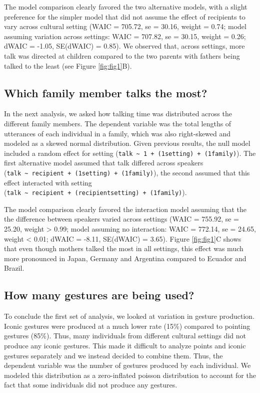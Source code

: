\documentclass[
  man,floatsintext]{apa6}
\begin{document}
The model comparison clearly favored the two alternative models, with a slight preference for the simpler model that did not assume the effect of recipients to vary across cultural setting (WAIC = 705.72, se = 30.16, weight = 0.74; model assuming variation across settings: WAIC = 707.82, se = 30.15, weight = 0.26; dWAIC = -1.05, SE(dWAIC) = 0.85). We observed that, across settings, more talk was directed at children compared to the two parents with fathers being talked to the least (see Figure \ref{fig:fig1}B).

\hypertarget{which-family-member-talks-the-most}{%
\subsection{Which family member talks the most?}\label{which-family-member-talks-the-most}}

In the next analysis, we asked how talking time was distributed across the different family members. The dependent variable was the total lengths of utterances of each individual in a family, which was also right-skewed and modeled as a skewed normal distribution. Given previous results, the null model included a random effect for setting (\texttt{talk\ \textasciitilde{}\ 1\ +\ (1\textbar{}setting)\ +\ (1\textbar{}family)}). The first alternative model assumed that talk differed across speakers (\texttt{talk\ \textasciitilde{}\ recipient\ +\ (1\textbar{}setting)\ +\ (1\textbar{}family)}), the second assumed that this effect interacted with setting (\texttt{talk\ \textasciitilde{}\ recipient\ +\ (recipient\textbar{}setting)\ +\ (1\textbar{}family)}).

The model comparison clearly favored the interaction model assuming that the the difference between speakers varied across settings (WAIC = 755.92, se = 25.20, weight \textgreater{} 0.99; model assuming no interaction: WAIC = 772.14, se = 24.65, weight \textless{} 0.01; dWAIC = -8.11, SE(dWAIC) = 3.65). Figure \ref{fig:fig1}C shows that even though mothers talked the most in all settings, this effect was much more pronounced in Japan, Germany and Argentina compared to Ecuador and Brazil.

\hypertarget{how-many-gestures-are-being-used}{%
\subsection{How many gestures are being used?}\label{how-many-gestures-are-being-used}}

To conclude the first set of analysis, we looked at variation in gesture production. Iconic gestures were produced at a much lower rate (15\%) compared to pointing gestures (85\%). Thus, many individuals from different cultural settings did not produce any iconic gestures. This made it difficult to analyze points and iconic gestures separately and we instead decided to combine them. Thus, the dependent variable was the number of gestures produced by each individual. We modeled this distribution as a zero-inflated poisson distribution to account for the fact that some individuals did not produce any gestures.
\end{document}
